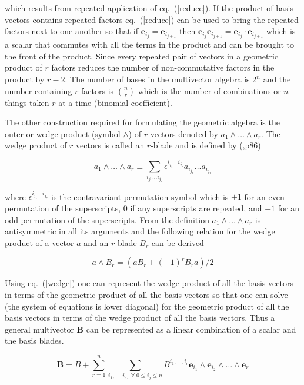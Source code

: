 \documentclass[12pt]{report}
\newcommand{\bm}[1]{\boldsymbol{#1}}
\newcommand{\W}{\wedge}
\newcommand{\eb}{\bm{e}}
\begin{document}
which results from repeated application of eq.~(\ref{reduce}).  If the product of basis vectors contains repeated factors
eq.~(\ref{reduce}) can be used to bring the repeated factors next to one another so that if $\eb_{i_{j}} = \eb_{i_{j+1}}$
then $\eb_{i_{j}}\eb_{i_{j+1}} = \eb_{i_{j}}\cdot \eb_{i_{j+1}}$ which is a scalar that commutes with all the terms in the product
and can be brought to the front of the product.  Since every repeated pair of vectors in a geometric product of $r$ factors
reduces the number of non-commutative factors in the product by $r-2$. The number of bases in the multivector algebra is $2^{n}$
and the number containing $r$ factors is ${n\choose r}$ which is the number of combinations or $n$ things
taken $r$ at a time (binomial coefficient).

The other construction required for formulating the geometric algebra is the outer or wedge product (symbol $\W$) of $r$
vectors denoted by $a_{1}\W\dots\W a_{r}$.  The wedge product of $r$ vectors is called an $r$-blade and is defined
by (\cite{Doran},p86)

   \begin{equation}
      a_{1}\W\dots\W a_{r} \equiv \sum_{i_{j_{1}}\dots i_{j_{r}}} \epsilon^{i_{j_{1}}\dots i_{j_{r}}}a_{i_{j_{1}}}\dots a_{i_{j_{1}}}
   \end{equation}

where $\epsilon^{i_{j_{1}}\dots i_{j_{r}}}$ is the contravariant permutation symbol which is $+1$ for an even permutation of the
superscripts, $0$ if any superscripts are repeated, and $-1$ for an odd permutation of the superscripts. From the definition
$a_{1}\W\dots\W a_{r}$ is antisymmetric in all its arguments and the following relation for the wedge product of a vector $a$ and an
$r$-blade $B_{r}$ can be derived

   \begin{equation}\label{wedge}
      a\W B_{r} = (aB_{r}+(-1)^{r}B_{r}a)/2
   \end{equation}

Using eq.~(\ref{wedge}) one can represent the wedge product of all the basis vectors
in terms of the geometric product of all the basis vectors so that one can solve (the system
of equations is lower diagonal) for the geometric product of all the basis vectors in terms of
the wedge product of all the basis vectors.  Thus a general multivector $\bm{B}$ can be
represented as a linear combination of a scalar and the basis blades.

   \begin{equation}
      \bm{B} = B + \sum_{r=1}^{n}\sum_{i_{1},\dots,i_{r},\;\forall\; 0\le i_{j} \le n} B^{i_{1},\dots,i_{r}}\eb_{i_{1}}\W \eb_{i_{2}}\W\dots\W \eb_{r}
   \end{equation}
\end{document}
